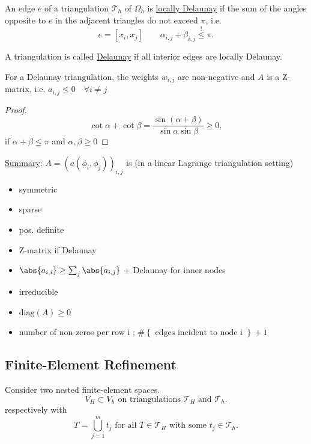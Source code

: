 \begin{definition}
\label{thm:locallydelaunay}
	An edge $e$ of a triangulation $\mathcal{T}_{h}$ of $\Omega _{h}$ is \underline{locally Delaunay} if the sum of the angles opposite to $e$ in the adjacent triangles do not exceed $\pi $, i.e.
	\[
      e = [x_{i}, x_{j}] \qquad \alpha_{i,j} + \beta_{i,j}\overset{!}{\leq} \pi 
	.\] 
\end{definition}

\begin{definition}
\label{thm:delaunay}
	A triangulation is called \underline{Delaunay} if all interior edges are locally Delaunay.
\end{definition}

\begin{lemma}
\label{thm:delaunaylemma}
	For a Delaunay triangulation, the weights $w_{i,j}$ are non-negative and $A$ is a Z-matrix, i.e. $a_{i,j} \leq 0 \quad \forall i \neq j$
\end{lemma}

\begin{proof}
\label{thm:delaunaylemmaproof}
	\[
		\cot \alpha + \cot \beta = \frac{\sin(\alpha+\beta)}{\sin \alpha \sin \beta} \geq 0
	,\] 	
	if $\alpha + \beta \leq \pi $ and $\alpha,\beta \geq 0 $
\end{proof}

\underline{Summary}:
$A=(a(\phi _{i}, \phi _{j}))_{i,j}$ is (in a linear Lagrange triangulation setting)
\begin{itemize}
	\item symmetric
	\item sparse
	\item pos. definite
	\item Z-matrix if Delaunay
	\item $\abs{a_{i,i}} \geq \sum_{j}^{}{\abs{a_{i,j}} }$ + Delaunay for inner nodes
	\item irreducible
	\item $\text{diag}(A) \geq 0$
	\item number of non-zeros per row i : $\# \left\{ \text{ edges incident to node i } \right\} + 1$
\end{itemize}

\subsection{Finite-Element Refinement}
\label{sec:Finite-Element Refinement}

Consider two nested finite-element spaces.
\[
V_{H} \subset V_{h} \text{ on triangulations } \mathcal{T}_{H} \text{ and } \mathcal{T}_{h}
.\] 
respectively with 
\[
T = \bigcup_{j=1}^{m}t_{j} \text{ for all  } T \in \mathcal{T}_{H} \text{ with some } t_{j} \in \mathcal{T}_{h}
.\] 


